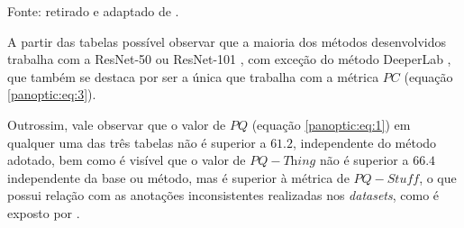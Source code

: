 \begin{table}[H]
    \centering
    \caption{Comparação de desempenho no \textit{dataset} Mapillary.}
    \label{conclusion:table:3}

    \vspace*{1 cm}
    Fonte: retirado e adaptado de \cite{Awesome-panoptic-segmentation:List}.
\end{table}

A partir das tabelas possível observar que a maioria dos métodos desenvolvidos trabalha com a ResNet-50 ou ResNet-101 \cite{He2016}, com exceção do método DeeperLab \cite{Yang2019DeeperLab:Parser}, que também se destaca por ser a única que trabalha com a métrica $PC$ (equação \ref{panoptic:eq:3}).

Outrossim, vale observar que o valor de $PQ$ (equação \ref{panoptic:eq:1}) em qualquer uma das três tabelas não é superior a $61.2$, independente do método adotado, bem como é visível que o valor de $PQ-\textit{Thing}$ não é superior a  $66.4$ independente da base ou método, mas é superior à métrica de $PQ-\textit{Stuff}$, o que possui relação com as anotações inconsistentes realizadas nos \textit{datasets}, como é exposto por \cite{Kirillov2019a}.

